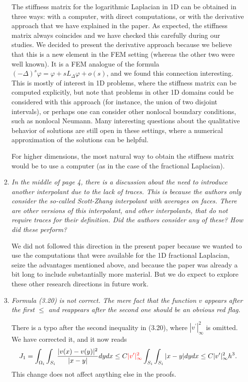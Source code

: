\documentclass[11 pt]{article}
\numberwithin{equation}{section}
\begin{document}
\begin{enumerate}
The stiffness matrix for the logarithmic Laplacian in 1D can be obtained in three ways: with a computer, with direct computations, or with the derivative approach that we have explained in the paper. As expected, the stiffness matrix always coincides and we have checked this carefully during our studies. We decided to present the derivative approach because we believe that this is a new element in the FEM setting (whereas the other two were well known). It is a FEM analogue of the formula
$(-\Delta)^s\varphi = \varphi + sL_\Delta \varphi + o(s)$, and we found this connection interesting.  This is mostly of interest in 1D problems, where the stiffness matrix can be computed explicitly, but note that problems in other 1D domains could be considered with this approach (for instance, the union of two disjoint intervals), or perhaps one can consider other nonlocal boundary conditions, such as nonlocal Neumann.  Many interesting questions about the qualitative behavior of solutions are still open in these settings, where a numerical approximation of the solutions can be helpful.

For higher dimensions, the most natural way to obtain the stiffness matrix would be to use a computer (as in the case of the fractional Laplacian).

    \item \emph{In the middle of page 4, there is a discussion about the need to introduce another interpolant due to the lack of traces. This is because the authors only consider the so-called Scott-Zhang interpolant with averages on faces. There are other versions of this interpolant, and other interpolants, that do not require traces for their definition. Did the authors consider any of these? How did these perform?}

    We did not followed this direction in the present paper because we wanted to use the computations that were available for the 1D fractional Laplacian, seize the advantages mentioned above, and because the paper was already a bit long to include substantially more material.  But we do expect to explore these other research directions in future work.

    \item \emph{Formula (3.20) is not correct. The mere fact that the function \( v \) appears after the first \( \leq \) and reappears after the second one should be an obvious red flag.}

    There is a typo after the second inequality in (3.20), where $|v^\prime|^2_{\infty}$ is omitted. We have corrected it, and it now reads
    \begin{equation*}
    J_1 = \int_{\Omega_i}\int_{S_i}\frac{|v(x)-v(y)|^2}{|x-y|}dy dx \leq C {
    \color{red}|v^\prime|^2_{\infty}}\int_{S_i}\int_{S_i}|x-y|dy dx \leq C{|v^\prime|^2_{\infty}}h^3.
\end{equation*}
This change does not affect anything else in the proofs.


\end{enumerate}
\end{document}
